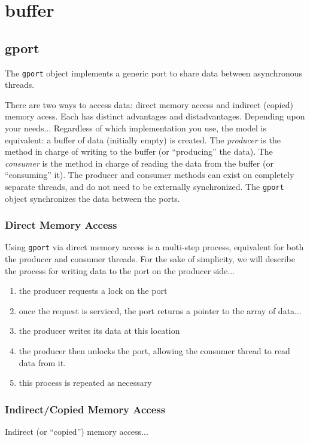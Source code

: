 % 
%
\section{buffer}
\label{module:buffer}

%
%
\subsection{gport}
\label{module:buffer:gport}
The {\tt gport} object implements a generic port to share data
between asynchronous threads.

There are two ways to access data: direct memory access and 
indirect (copied) memory acess.
Each has distinct advantages and distadvantages.
Depending upon your needs...
Regardless of which implementation you use, the model is equivalent:
a buffer of data (initially empty) is created.
The {\it producer} is the method in charge of writing to the buffer (or
``producing'' the data).
The {\it consumer} is the method in charge of reading the data from the buffer
(or ``consuming'' it).
The producer and consumer methods can exist on completely separate threads,
and do not need to be externally synchronized.
The {\tt gport} object synchronizes the data between the ports.

\subsubsection{Direct Memory Access}
Using {\tt gport} via direct memory access is a multi-step process, equivalent
for both the producer and consumer threads.
For the sake of simplicity, we will describe the process for writing data to
the port on the producer side...

\begin{enumerate}
\item the producer requests a lock on the port
\item once the request is serviced, the port returns a pointer to the array of
      data...
\item the producer writes its data at this location
\item the producer then unlocks the port, allowing the consumer thread to read
      data from it.
\item this process is repeated as necessary
\end{enumerate}



\subsubsection{Indirect/Copied Memory Access}
Indirect (or ``copied'') memory access...

